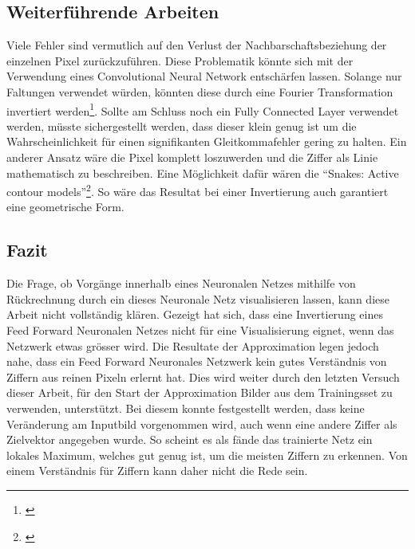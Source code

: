 \documentclass[Interploate_hadwritten_Digits.tex]{subfiles}
\begin{document}
	\subsection{Weiterführende Arbeiten}
	Viele Fehler sind vermutlich auf den Verlust der Nachbarschaftsbeziehung der einzelnen Pixel zurückzuführen. Diese Problematik könnte sich mit der Verwendung eines Convolutional Neural Network entschärfen lassen. Solange nur Faltungen verwendet würden, könnten diese durch eine Fourier Transformation invertiert werden\footnote{\cite{weisstein-convolution_theorem}}. Sollte am Schluss noch ein Fully Connected Layer verwendet werden, müsste sichergestellt werden, dass dieser klein genug ist um die Wahrscheinlichkeit für einen signifikanten Gleitkommafehler gering zu halten.
	Ein anderer Ansatz wäre die Pixel komplett loszuwerden und die Ziffer als Linie mathematisch zu beschreiben. Eine Möglichkeit dafür wären die ``Snakes: Active contour models''\footnote{\cite{kass-snake}}. So wäre das Resultat bei einer Invertierung auch garantiert eine geometrische Form.
	
	\subsection{Fazit}
	Die Frage, ob Vorgänge innerhalb eines Neuronalen Netzes mithilfe von Rückrechnung durch ein dieses Neuronale Netz visualisieren lassen, kann diese Arbeit nicht vollständig klären. Gezeigt hat sich, dass eine Invertierung eines Feed Forward Neuronalen Netzes nicht für eine Visualisierung eignet, wenn das Netzwerk etwas grösser wird. Die Resultate der Approximation legen jedoch nahe, dass ein Feed Forward Neuronales Netzwerk kein gutes Verständnis von Ziffern aus reinen Pixeln erlernt hat. Dies wird weiter durch den letzten Versuch dieser Arbeit, für den Start der Approximation Bilder aus dem Trainingsset zu verwenden, unterstützt. Bei diesem konnte festgestellt werden, dass keine Veränderung am Inputbild vorgenommen wird, auch wenn eine andere Ziffer als Zielvektor angegeben wurde. So scheint es als fände das trainierte Netz ein lokales Maximum, welches gut genug ist, um die meisten Ziffern zu erkennen. Von einem Verständnis für Ziffern kann daher nicht die Rede sein.
	
\end{document}
